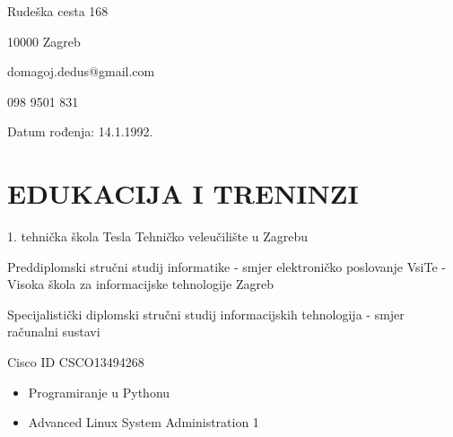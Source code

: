 \documentclass{cv}
\begin{document}

Rudeška cesta 168

10000 Zagreb

domagoj.dedus@gmail.com

098 9501 831

Datum rođenja: 14.1.1992.
\section{EDUKACIJA I TRENINZI}
1. tehnička škola Tesla
Tehničko veleučilište u Zagrebu

Preddiplomski stručni studij informatike - smjer elektroničko poslovanje
VsiTe - Visoka škola za informacijske tehnologije Zagreb

Specijalistički diplomski stručni studij informacijskih tehnologija - smjer računalni sustavi

Cisco ID CSCO13494268
\begin{itemize}
    \setlength\itemsep{0.1cm}
    \item Programiranje u Pythonu
    \item Advanced Linux System Administration 1
\end{itemize}
\end{document}
